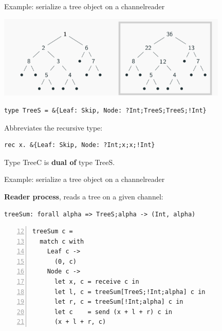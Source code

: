 \documentclass[10pt]{beamer}
\begin{document}
\begin{frame}[fragile]{Example:  serialize a tree object on a channel\hfill{\color{mLightBrown}reader}}

\includegraphics[width=11cm]{img/treesumR}
\pause

\begin{lstlisting}
type TreeS = &{Leaf: Skip, Node: ?Int;TreeS;TreeS;!Int}
\end{lstlisting}
Abbreviates the recursive type:
\begin{lstlisting}
rec x. &{Leaf: Skip, Node: ?Int;x;x;!Int}
\end{lstlisting}

\pause
\centering
\begin{tcolorbox}
	Type TreeC is \textbf{dual of} type TreeS.
\end{tcolorbox}

\end{frame}



\begin{frame}[fragile]{Example:  serialize a tree object on a channel\hfill{\color{mLightBrown}reader}}

\textbf{Reader process}, reads a tree on a given channel:
	
\begin{lstlisting}
treeSum: forall alpha => TreeS;alpha -> (Int, alpha)
\end{lstlisting}

\label{lst:treeSum}
\begin{lstlisting}[numbers=left,firstnumber=12, xleftmargin=0.7cm]
treeSum c =
  match c with
    Leaf c ->
      (0, c)
    Node c ->
      let x, c = receive c in
      let l, c = treeSum[TreeS;!Int;alpha] c in
      let r, c = treeSum[!Int;alpha] c in
      let c    = send (x + l + r) c in
      (x + l + r, c)
\end{lstlisting}
\end{frame}
\end{document}
